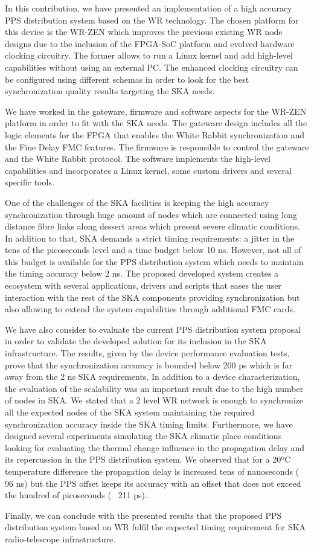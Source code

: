 In this contribution, we have presented an implementation of a high accuracy 
PPS distribution system based on the WR technology. The chosen platform for 
this device is the WR-ZEN which improves the previous existing WR node designs 
due to the inclusion of the FPGA-SoC platform and evolved hardware clocking 
circuitry. The former allows to run a Linux kernel and add high-level capabilities without using an external PC. The enhanced clocking circuitry can be configured using different schemas in order to look for the best synchronization quality results targeting the SKA needs. 

We have worked in the gateware, firmware and software aspects for the WR-ZEN platform in order to fit with the SKA needs. The gateware design includes all the logic elements for the FPGA that enables the White Rabbit synchronization and the Fine Delay FMC features. The firmware is responsible to control the gateware and the White Rabbit protocol. The software implements the high-level capabilities and incorporates a Linux kernel, some custom drivers and several specific tools. 

One of the challenges of the SKA facilities is keeping the high accuracy 
synchronization through huge amount of nodes which are connected using long 
distance fibre links along dessert areas which present severe climatic 
conditions. In addition to that, SKA demands a strict timing requirements: a 
jitter in the tens of the picoseconds level and a time budget below 10 ns. 
However, not all of this budget is available for the PPS distribution system 
which needs to maintain the timing accuracy below 2 ns. The proposed developed 
system creates a ecosystem with several applications, drivers and scripts that 
eases the user interaction with the rest of the 
SKA components providing synchronization but also allowing to extend the system capabilities through additional FMC cards.

We have also consider to evaluate the current PPS distribution system proposal 
in order to validate the developed solution for its inclusion in the SKA 
infrastructure. The results, given by the device performance evaluation tests, 
prove that the synchronization accuracy is bounded below 200 ps which is far 
away from the 2 ns SKA requirements. In addition to a device characterization, 
the evaluation of the scalability was an important result due to the high 
number of nodes in SKA. We stated that a 2 level WR network is enough to 
synchronize all the expected nodes of the SKA system maintaining the required 
synchronization accuracy inside the SKA timing limits. Furthermore, we have 
designed several experiments simulating the SKA climatic place conditions 
looking for evaluating the thermal change influence in the propagation delay 
and its repercussion in the PPS distribution system. We observed that for a 
20ºC temperature difference the propagation delay is increased tens of 
nanoseconds (~ 96 ns) but the PPS offset keeps its accuracy with an offset that 
does not exceed the hundred of picoseconds (~ 211 ps). 

Finally, we can conclude with the presented results that the proposed PPS 
distribution system based on WR fulfil the expected timing requirement for SKA 
radio-telescope infrastructure.